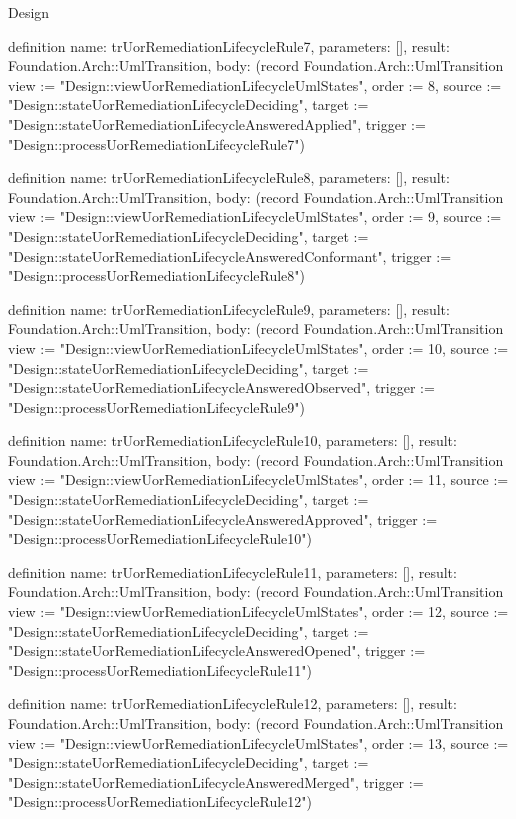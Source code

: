 \begin{lexlean}{Design}
\begin{semanticmodule}
definition{
  name: trUorRemediationLifecycleRule7,
  parameters: [],
  result: Foundation.Arch::UmlTransition,
  body: (record Foundation.Arch::UmlTransition {view := "Design::viewUorRemediationLifecycleUmlStates", order := 8, source := "Design::stateUorRemediationLifecycleDeciding", target := "Design::stateUorRemediationLifecycleAnsweredApplied", trigger := "Design::processUorRemediationLifecycleRule7"})
}

definition{
  name: trUorRemediationLifecycleRule8,
  parameters: [],
  result: Foundation.Arch::UmlTransition,
  body: (record Foundation.Arch::UmlTransition {view := "Design::viewUorRemediationLifecycleUmlStates", order := 9, source := "Design::stateUorRemediationLifecycleDeciding", target := "Design::stateUorRemediationLifecycleAnsweredConformant", trigger := "Design::processUorRemediationLifecycleRule8"})
}

definition{
  name: trUorRemediationLifecycleRule9,
  parameters: [],
  result: Foundation.Arch::UmlTransition,
  body: (record Foundation.Arch::UmlTransition {view := "Design::viewUorRemediationLifecycleUmlStates", order := 10, source := "Design::stateUorRemediationLifecycleDeciding", target := "Design::stateUorRemediationLifecycleAnsweredObserved", trigger := "Design::processUorRemediationLifecycleRule9"})
}

definition{
  name: trUorRemediationLifecycleRule10,
  parameters: [],
  result: Foundation.Arch::UmlTransition,
  body: (record Foundation.Arch::UmlTransition {view := "Design::viewUorRemediationLifecycleUmlStates", order := 11, source := "Design::stateUorRemediationLifecycleDeciding", target := "Design::stateUorRemediationLifecycleAnsweredApproved", trigger := "Design::processUorRemediationLifecycleRule10"})
}

definition{
  name: trUorRemediationLifecycleRule11,
  parameters: [],
  result: Foundation.Arch::UmlTransition,
  body: (record Foundation.Arch::UmlTransition {view := "Design::viewUorRemediationLifecycleUmlStates", order := 12, source := "Design::stateUorRemediationLifecycleDeciding", target := "Design::stateUorRemediationLifecycleAnsweredOpened", trigger := "Design::processUorRemediationLifecycleRule11"})
}

definition{
  name: trUorRemediationLifecycleRule12,
  parameters: [],
  result: Foundation.Arch::UmlTransition,
  body: (record Foundation.Arch::UmlTransition {view := "Design::viewUorRemediationLifecycleUmlStates", order := 13, source := "Design::stateUorRemediationLifecycleDeciding", target := "Design::stateUorRemediationLifecycleAnsweredMerged", trigger := "Design::processUorRemediationLifecycleRule12"})
}


\end{semanticmodule}
\end{lexlean}
